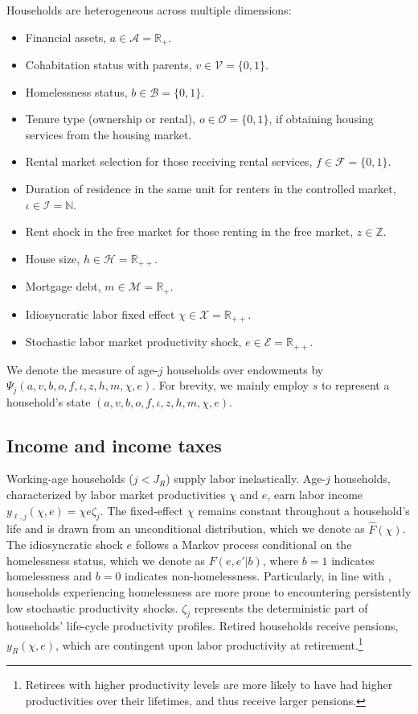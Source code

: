 \documentclass[parskip=full]{article}
\begin{document}
Households are heterogeneous across multiple dimensions:

\begin{itemize}
    \item Financial assets, $a\in \mathcal{A}=\mathbb{R}_{+}$.
    \item Cohabitation status with parents, $v\in \mathcal{V}=\{0,1\}$.
    \item Homelessness status, $b \in \mathcal{B}=\{0,1\}$.
    \item Tenure type (ownership or rental), $o \in \mathcal{O}=\{0,1\}$, if obtaining housing services from the housing market.
    \item Rental market selection for those receiving rental services, $f \in \mathcal{F}=\{0,1\}$.
    \item Duration of residence in the same unit for renters in the controlled market, $\iota \in \mathcal{I}=\mathbb{N}$.
    \item Rent shock in the free market for those renting in the free market, $z \in \mathbb{Z}$.
    \item House size, $h\in \mathcal{H}=\mathbb{R}_{++}$.
    \item Mortgage debt, $m \in \mathcal{M}=\mathbb{R}_{+}$.
    \item Idiosyncratic labor fixed effect $\chi \in \mathcal{X}=\mathbb{R}_{++}$.
    \item Stochastic labor market productivity shock, $e \in \mathcal{E} = \mathbb{R}_{++}$.
\end{itemize}
 
\noindent We denote the measure of age-$j$ households over endowments by $\Psi_{j}(a,v,b,o,f,\iota,z,h,m,\chi,e)$. For brevity, we mainly employ $s$ to represent a household's state $(a,v,b,o,f,\iota,z,h,m,\chi,e)$.

\subsection{Income and income taxes}\label{subsection:income}

Working-age households ($j<J_{R}$) supply labor inelastically. Age-$j$ households, characterized by labor market productivities $\chi$ and $e$, earn labor income $y_{\ell,j}(\chi,e)=\chi e\zeta_j$. The fixed-effect $\chi$ remains constant throughout a household's life and is drawn from an unconditional distribution, which we denote as $\hat{F}(\chi)$. The idiosyncratic shock $e$ follows a Markov process conditional on the homelessness status, which we denote as $F(e,e'|b)$, where $b=1$ indicates homelessness and $b=0$ indicates non-homelessness. Particularly, in line with \citet{az-2024}, households experiencing homelessness are more prone to encountering persistently low stochastic productivity shocks. $\zeta_j$ represents the deterministic part of households' life-cycle productivity profiles. Retired households receive pensions, $y_{R}(\chi,e)$, which are contingent upon labor productivity at retirement.\footnote{Retirees with higher productivity levels are more likely to have had higher productivities over their lifetimes, and thus receive larger pensions.}
\end{document}
